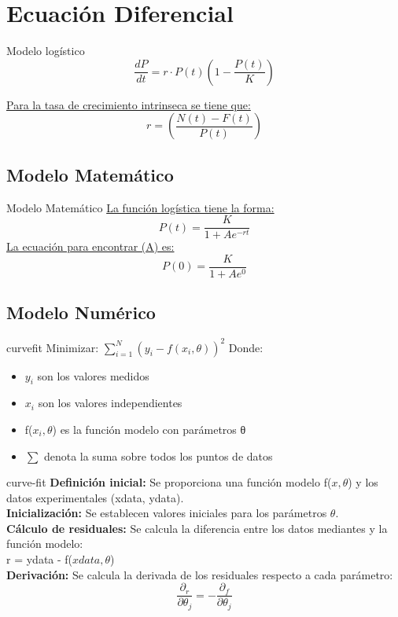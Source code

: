 \documentclass{beamer}
\begin{document}
\section{Ecuación Diferencial}
\begin{frame}{Modelo logístico}
$$\frac{dP}{dt} = r \cdot P(t)(1 - \frac{P(t)}{K}) $$

\underline{Para la tasa de crecimiento intrinseca se tiene que:} $$r = (\frac{N(t)-F(t)}{P(t)})$$
\end{frame}

\subsection{Modelo Matemático}
\begin{frame}{Modelo Matemático}
    \underline{La función logística tiene la forma:} $$P(t) = \frac{K}{1 + Ae^{-rt}}$$
    \underline{La ecuación para encontrar (A) es:} $$P(0) = \frac{K}{1 + Ae^{0}}$$
\end{frame}

\subsection{Modelo Numérico}
\begin{frame}{curvefit}
    Minimizar: $\sum_{i=1}^{N} (y_{i} - f(x_{i}, \theta))^2 $ 
Donde:\\
\begin{itemize}
	\item $y_{i}$ son los valores medidos
	\item $x_{i}$ son los valores independientes
	\item f($x_{i}, \theta$) es la función modelo con parámetros θ
	\item	$\sum$ denota la suma sobre todos los puntos de datos
\end{itemize}
\end{frame}

\begin{frame}{curve-fit}
    \textbf{Definición inicial:} Se proporciona una función modelo f($x, \theta$) y los datos experimentales (xdata, ydata).\\
    \textbf{Inicialización:} Se establecen valores iniciales para los parámetros $\theta$.\\
    \textbf{Cálculo de residuales:} Se calcula la diferencia entre los datos mediantes y la función modelo:\\ r = ydata - f($xdata, \theta$)\\
    \textbf{Derivación:} Se calcula la derivada de los residuales respecto a cada parámetro:\\
    $$	\frac{\partial_{r}}{\partial \theta_{j}} = -\frac{\partial_{f}}{\partial \theta_{j}} $$
\end{frame}
\end{document}
